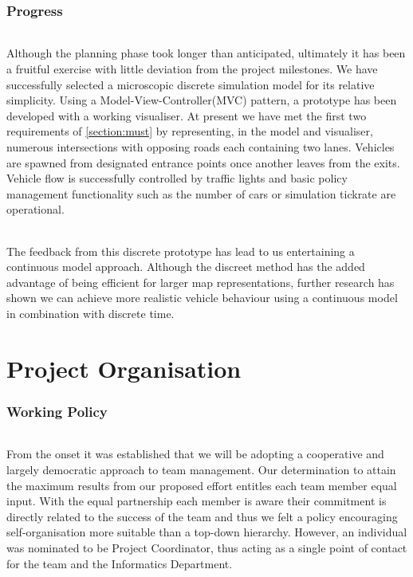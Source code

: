 \documentclass[11pt,a4paper]{article}
\begin{document}
\section{Progress}
\paragraph{}
Although the planning phase took longer than anticipated, ultimately it has been a fruitful exercise with little deviation from the project milestones.  We have successfully selected a microscopic discrete simulation model for its relative simplicity.  Using a Model-View-Controller(MVC) pattern, a prototype has been developed with a working visualiser.  At present we have met the first two requirements of \ref{section:must} by representing, in the model and visualiser, numerous intersections with opposing roads each containing two lanes.  Vehicles are spawned from designated entrance points once another leaves from the exits.  Vehicle flow is successfully controlled by traffic lights and basic policy management functionality such as the number of cars or simulation tickrate are operational. 
\paragraph{}
The feedback from this discrete prototype has lead to us entertaining a continuous model approach.  Although the discreet method has the added advantage of being efficient for larger map representations, further research has shown we can achieve more realistic vehicle behaviour using a continuous model in combination with discrete time.

\pagebreak

\part{Project Organisation}

\section{Working Policy}
\paragraph{}
From the onset it was established that we will be adopting a cooperative and largely democratic approach to team management.  Our determination to attain the maximum results from our proposed effort entitles each team member equal input.  With the equal partnership each member is aware their commitment is directly related to the success of the team and thus we felt a policy encouraging self-organisation more suitable than a top-down hierarchy.  However, an individual was nominated to be Project Coordinator, thus acting as a single point of contact for the team and the Informatics Department.
\end{document}
